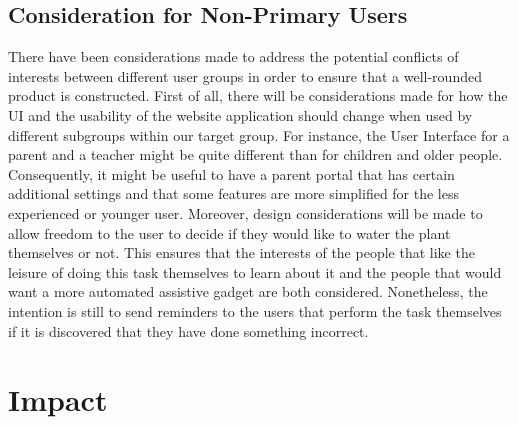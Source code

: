 \documentclass{article}
\begin{document}
\subsection{Consideration for Non-Primary Users}
There have been considerations made to address the potential conflicts of interests between different user groups in order to ensure that a well-rounded product is constructed. First of all, there will be considerations made for how the UI and the usability of the website application should change when used by different subgroups within our target group. For instance, the User Interface for a parent and a teacher might be quite different than for children and older people. Consequently, it might be useful to have a parent portal that has certain additional settings and that some features are more simplified for the less experienced or younger user. Moreover, design considerations will be made to allow freedom to the user to decide if they would like to water the plant themselves or not. This ensures that the interests of the people that like the leisure of doing this task themselves to learn about it and the people that would want a more automated assistive gadget are both considered. Nonetheless, the intention is still to send reminders to the users that perform the task themselves if it is discovered that they have done something incorrect.


\section{Impact}
\end{document}
